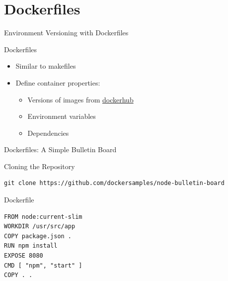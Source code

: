 \documentclass[10pt, compress, aspectratio=169, xcolor={table,usenames,dvipsnames}]{beamer}
\begin{document}
\section{Dockerfiles}
\label{sec:org758dfc5}
\begin{frame}[label={sec:orgd4f5981}]{Environment Versioning with Dockerfiles}
\begin{block}{Dockerfiles}
\begin{itemize}
\item Similar to \alert{makefiles}
\item Define container \alert{properties}:
\begin{itemize}
\item Versions of images from \href{https://hub.docker.com/search?q=\&type=image}{dockerhub}
\item Environment variables
\item Dependencies
\end{itemize}
\end{itemize}
\end{block}
\end{frame}
\begin{frame}[label={sec:org4881db0},fragile]{Dockerfiles: A Simple Bulletin Board}
 \begin{block}{Cloning the Repository}
\lstset{language=bash,label= ,caption= ,captionpos=b,numbers=none}
\begin{lstlisting}
git clone https://github.com/dockersamples/node-bulletin-board
\end{lstlisting}
\end{block}
\begin{block}{Dockerfile}
\lstset{language=dockerfile,label= ,caption= ,captionpos=b,numbers=none}
\begin{lstlisting}
FROM node:current-slim
WORKDIR /usr/src/app
COPY package.json .
RUN npm install
EXPOSE 8080
CMD [ "npm", "start" ]
COPY . .
\end{lstlisting}
\end{block}
\end{frame}
\end{document}
